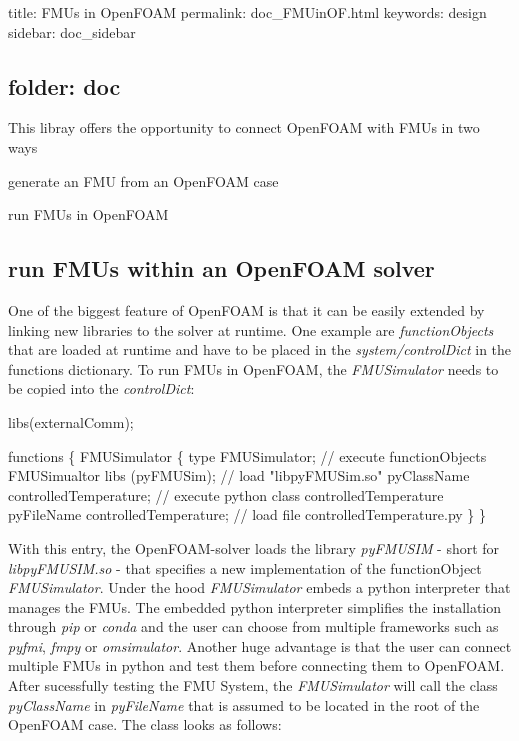 

 title\+: F\+M\+Us in Open\+F\+O\+AM permalink\+: doc\+\_\+\+F\+M\+Uin\+O\+F.\+html keywords\+: design sidebar\+: doc\+\_\+sidebar \subsection*{folder\+: doc }

This libray offers the opportunity to connect Open\+F\+O\+AM with F\+M\+Us in two ways


\begin{DoxyItemize}
\item generate an F\+MU from an Open\+F\+O\+AM case
\item run F\+M\+Us in Open\+F\+O\+AM
\end{DoxyItemize}

\subsection*{run F\+M\+Us within an Open\+F\+O\+AM solver}

One of the biggest feature of Open\+F\+O\+AM is that it can be easily extended by linking new libraries to the solver at runtime. One example are {\itshape function\+Objects} that are loaded at runtime and have to be placed in the {\itshape system/control\+Dict} in the functions dictionary. To run F\+M\+Us in Open\+F\+O\+AM, the {\itshape F\+M\+U\+Simulator} needs to be copied into the {\itshape control\+Dict}\+:


\begin{DoxyCode}
libs(externalComm);

functions
\{
    FMUSimulator
    \{
        type            FMUSimulator; \textcolor{comment}{// execute functionObjects FMUSimualtor}
        libs            (pyFMUSim); \textcolor{comment}{// load "libpyFMUSim.so"}
        pyClassName     controlledTemperature; \textcolor{comment}{// execute python class controlledTemperature}
        pyFileName      controlledTemperature; \textcolor{comment}{// load file controlledTemperature.py}
    \}
\}
\end{DoxyCode}


With this entry, the Open\+F\+O\+A\+M-\/solver loads the library {\itshape py\+F\+M\+U\+S\+IM} -\/ short for {\itshape libpy\+F\+M\+U\+S\+I\+M.\+so} -\/ that specifies a new implementation of the function\+Object {\itshape F\+M\+U\+Simulator}. Under the hood {\itshape F\+M\+U\+Simulator} embeds a python interpreter that manages the F\+M\+Us. The embedded python interpreter simplifies the installation through {\itshape pip} or {\itshape conda} and the user can choose from multiple frameworks such as {\itshape pyfmi}, {\itshape fmpy} or {\itshape omsimulator}. Another huge advantage is that the user can connect multiple F\+M\+Us in python and test them before connecting them to Open\+F\+O\+AM. After sucessfully testing the F\+MU System, the {\itshape F\+M\+U\+Simulator} will call the class {\itshape py\+Class\+Name} in {\itshape py\+File\+Name} that is assumed to be located in the root of the Open\+F\+O\+AM case. The class looks as follows\+:


